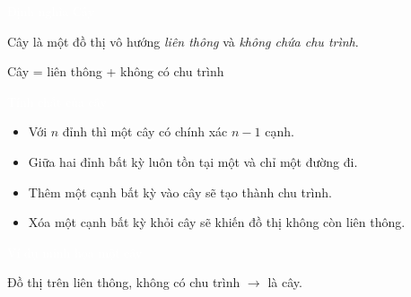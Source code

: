 \documentclass{beamer}
\title{\hlred{Cây — Cây khung — MST}}
\author{Nhóm 3}
\date{\hlcyan{03/2026}}
\newcommand{\hlblue}[1]{\textcolor{myblue}{#1}}
\newcommand{\hlgreen}[1]{\textcolor{mygreen}{#1}}
\newcommand{\hlred}[1]{\textcolor{myred}{#1}}
\newcommand{\hlpurple}[1]{\textcolor{mypurple}{#1}}
\newcommand{\hlorange}[1]{\textcolor{myorange}{#1}}
\newcommand{\hlwhite}[1]{\textcolor{white}{#1}}
\begin{document}
\frame{\titlepage}


\begin{frame}{\hlwhite{Định nghĩa Cây}}
\begin{tcolorbox}[title=\textbf{\hlgreen{Khái niệm}}]
\hlblue{Cây} là một đồ thị vô hướng \emph{\hlgreen{liên thông}} và \emph{\hlred{không chứa chu trình}}.
\end{tcolorbox}

\begin{tcolorbox}
\centering
\hlpurple{Cây = \hlgreen{liên thông} + \hlred{không có chu trình}}
\end{tcolorbox}
\end{frame}


\begin{frame}{\hlwhite{Tính chất của cây}}
\begin{itemize}
  \item Với \hlblue{$n$ đỉnh} thì một cây có chính xác \hlred{$n-1$ cạnh}.
  \item Giữa hai đỉnh bất kỳ luôn tồn tại \hlgreen{một và chỉ một đường đi}.
  \item Thêm một cạnh bất kỳ vào cây sẽ tạo thành \hlred{chu trình}.
  \item Xóa một cạnh bất kỳ khỏi cây sẽ khiến đồ thị \hlorange{không còn liên thông}.
\end{itemize}
\end{frame}


\begin{frame}{\hlwhite{Ví dụ minh họa một cây}}
\centering
{}

\vspace{0.3cm}
\hlpurple{Đồ thị trên liên thông, không có chu trình \(\rightarrow\) là cây.}
\end{frame}
\end{document}
